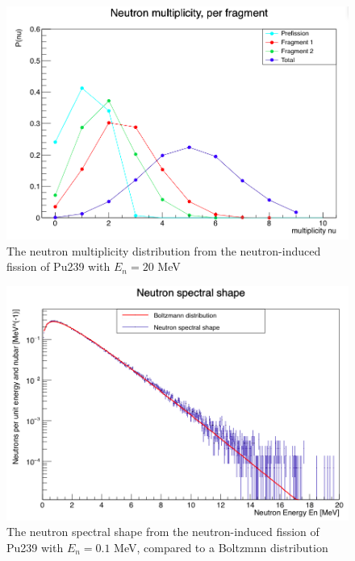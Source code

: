 \documentclass[]{article}
\begin{document}
\begin{figure} [H]
	\centering
	\includegraphics[scale=0.36]{Pu239_20_n_mult.png}
	\caption{The neutron multiplicity distribution from the neutron-induced fission of Pu239 with $E_n = 20$ MeV}
	\label{fig:Pu239_20_n_mult}
\end{figure}

\begin{figure} [H]
	\centering
	\includegraphics[scale=0.36]{Pu239_0_1_n_spectral_shape.png}
	\caption{The neutron spectral shape from the neutron-induced fission of Pu239 with $E_n = 0.1$ MeV, compared to a Boltzmnn distribution}
	\label{fig:Pu239_0_1_n_spectral_shape}
\end{figure}
\end{document}
